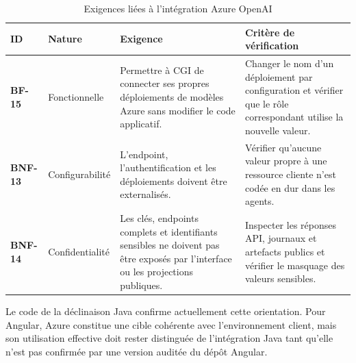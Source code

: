 \begin{table}[H]
    \centering
    \caption{Exigences liées à l'intégration Azure OpenAI}
    \label{tab:exigences-azure-ch1}
    \small
    \renewcommand{\arraystretch}{1.10}
    \begin{tabularx}{\textwidth}{|>{\bfseries\RaggedRight\arraybackslash}p{1.4cm}|>{\RaggedRight\arraybackslash}p{3.1cm}|>{\RaggedRight\arraybackslash}X|>{\RaggedRight\arraybackslash}p{4.3cm}|}
        \hline
        \rowcolor{cgilight!95}
        \textbf{ID} & \textbf{Nature} & \textbf{Exigence} & \textbf{Critère de vérification} \\
        \hline
        BF-15 & Fonctionnelle & Permettre à CGI de connecter ses propres déploiements de modèles Azure sans modifier le code applicatif. & Changer le nom d'un déploiement par configuration et vérifier que le rôle correspondant utilise la nouvelle valeur. \\
        \hline
        BNF-13 & Configurabilité & L'endpoint, l'authentification et les déploiements doivent être externalisés. & Vérifier qu'aucune valeur propre à une ressource cliente n'est codée en dur dans les agents. \\
        \hline
        BNF-14 & Confidentialité & Les clés, endpoints complets et identifiants sensibles ne doivent pas être exposés par l'interface ou les projections publiques. & Inspecter les réponses API, journaux et artefacts publics et vérifier le masquage des valeurs sensibles. \\
        \hline
    \end{tabularx}
\end{table}

Le code de la déclinaison Java confirme actuellement cette orientation. Pour Angular, Azure constitue une cible cohérente avec l'environnement client, mais son utilisation effective doit rester distinguée de l'intégration Java tant qu'elle n'est pas confirmée par une version auditée du dépôt Angular.

